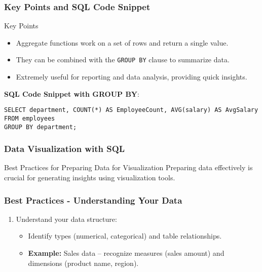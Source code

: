 \documentclass{beamer}
\begin{document}
\begin{frame}[fragile]
    \frametitle{Key Points and SQL Code Snippet}
    \begin{block}{Key Points}
        \begin{itemize}
            \item Aggregate functions work on a set of rows and return a single value.
            \item They can be combined with the \texttt{GROUP BY} clause to summarize data.
            \item Extremely useful for reporting and data analysis, providing quick insights.
        \end{itemize}
    \end{block}

    \textbf{SQL Code Snippet with GROUP BY}:
    \begin{lstlisting}
SELECT department, COUNT(*) AS EmployeeCount, AVG(salary) AS AvgSalary
FROM employees
GROUP BY department;
\end{lstlisting}
\end{frame}

\begin{frame}
    \frametitle{Data Visualization with SQL}
    \begin{block}{Best Practices for Preparing Data for Visualization}
        Preparing data effectively is crucial for generating insights using visualization tools.
    \end{block}
\end{frame}

\begin{frame}[fragile]
    \frametitle{Best Practices - Understanding Your Data}
    \begin{enumerate}
        \item Understand your data structure:
        \begin{itemize}
            \item Identify types (numerical, categorical) and table relationships.
            \item \textbf{Example:} Sales data – recognize measures (sales amount) and dimensions (product name, region).
        \end{itemize}
    \end{enumerate}
\end{frame}
\end{document}
